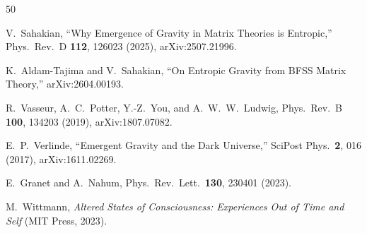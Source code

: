 \documentclass[aps,prd,twocolumn,superscriptaddress,nofootinbib,floatfix]{revtex4-2}
\begin{document}
\begin{thebibliography}{50}

V.~Sahakian, ``Why Emergence of Gravity in Matrix Theories is Entropic,'' Phys.\ Rev.\ D \textbf{112}, 126023 (2025), arXiv:2507.21996.

K.~Aldam-Tajima and V.~Sahakian, ``On Entropic Gravity from BFSS Matrix Theory,'' arXiv:2604.00193.

R.~Vasseur, A.~C.~Potter, Y.-Z.~You, and A.~W.~W.~Ludwig, Phys.\ Rev.\ B \textbf{100}, 134203 (2019), arXiv:1807.07082.

E.~P.~Verlinde, ``Emergent Gravity and the Dark Universe,'' SciPost Phys.\ \textbf{2}, 016 (2017), arXiv:1611.02269.

E.~Granet and A.~Nahum, Phys.\ Rev.\ Lett.\ \textbf{130}, 230401 (2023).

M.~Wittmann, \emph{Altered States of Consciousness: Experiences Out of Time and Self} (MIT Press, 2023).

\end{thebibliography}
\end{document}
